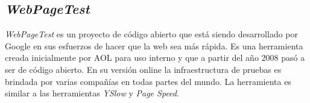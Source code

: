 \subsection{\emph{WebPageTest}}
\emph{WebPageTest} es un proyecto de código abierto que está siendo desarrollado por Google en sus esfuerzos de hacer que la web sea más rápida. Es una herramienta creada inicialmente por AOL para uso interno y que a partir del año 2008 pasó a ser de código abierto.
En su versión online la infraestructura de pruebas es brindada por varias compañías en todas partes del mundo.
La herramienta es similar a las herramientas \emph{YSlow} y \emph{Page Speed}.
